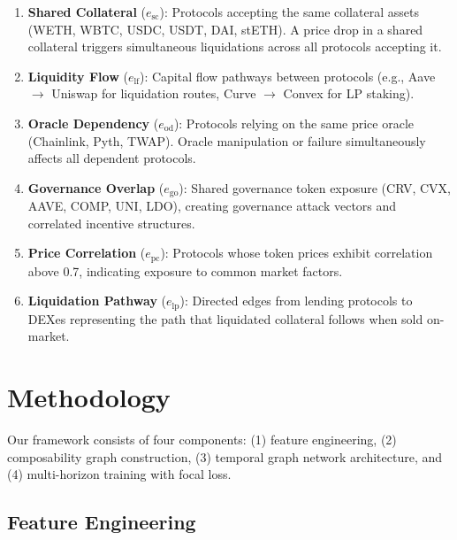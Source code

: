 \documentclass[journal]{IEEEtran}
\begin{document}
\begin{enumerate}
    \item \textbf{Shared Collateral} ($e_{\text{sc}}$): Protocols accepting the same collateral assets (WETH, WBTC, USDC, USDT, DAI, stETH). A price drop in a shared collateral triggers simultaneous liquidations across all protocols accepting it.

    \item \textbf{Liquidity Flow} ($e_{\text{lf}}$): Capital flow pathways between protocols (e.g., Aave $\rightarrow$ Uniswap for liquidation routes, Curve $\rightarrow$ Convex for LP staking).

    \item \textbf{Oracle Dependency} ($e_{\text{od}}$): Protocols relying on the same price oracle (Chainlink, Pyth, TWAP). Oracle manipulation or failure simultaneously affects all dependent protocols.

    \item \textbf{Governance Overlap} ($e_{\text{go}}$): Shared governance token exposure (CRV, CVX, AAVE, COMP, UNI, LDO), creating governance attack vectors and correlated incentive structures.

    \item \textbf{Price Correlation} ($e_{\text{pc}}$): Protocols whose token prices exhibit correlation above 0.7, indicating exposure to common market factors.

    \item \textbf{Liquidation Pathway} ($e_{\text{lp}}$): Directed edges from lending protocols to DEXes representing the path that liquidated collateral follows when sold on-market.
\end{enumerate}


\section{Methodology}

Our framework consists of four components: (1) feature engineering, (2) composability graph construction, (3) temporal graph network architecture, and (4) multi-horizon training with focal loss.

\subsection{Feature Engineering}
\end{document}
